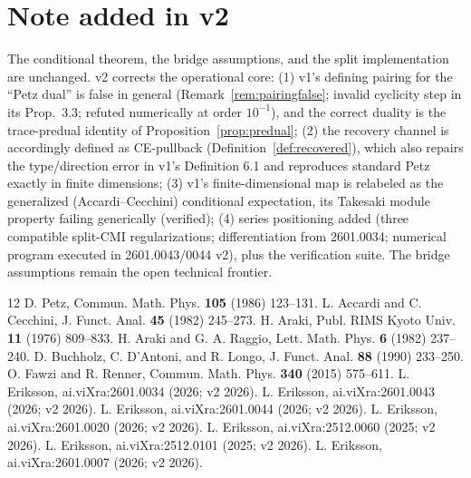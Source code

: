 \documentclass[11pt]{article}
\theoremstyle{remark}
\begin{document}
\section*{Note added in v2}
The conditional theorem, the bridge assumptions, and the split
implementation are unchanged. v2 corrects the operational core:
(1) v1's defining pairing for the ``Petz dual'' is false in general
(Remark~\ref{rem:pairingfalse}; invalid cyclicity step in its Prop.~3.3;
refuted numerically at order $10^{-1}$), and the correct duality is the
trace-predual identity of Proposition~\ref{prop:predual};
(2) the recovery channel is accordingly defined as CE-pullback
(Definition~\ref{def:recovered}), which also repairs the type/direction
error in v1's Definition 6.1 and reproduces standard Petz exactly in
finite dimensions;
(3) v1's finite-dimensional map is relabeled as the generalized
(Accardi--Cecchini) conditional expectation, its Takesaki module property
failing generically (verified);
(4) series positioning added (three compatible split-CMI regularizations;
differentiation from 2601.0034; numerical program executed in
2601.0043/0044 v2), plus the verification suite. The bridge assumptions
remain the open technical frontier.

\begin{thebibliography}{12}
 D. Petz, Commun. Math. Phys. \textbf{105} (1986)
123--131.
 L. Accardi and C. Cecchini, J. Funct. Anal. \textbf{45}
(1982) 245--273.
 H. Araki, Publ. RIMS Kyoto Univ. \textbf{11} (1976)
809--833.
 H. Araki and G. A. Raggio, Lett. Math. Phys. \textbf{6}
(1982) 237--240.
 D. Buchholz, C. D'Antoni, and R. Longo, J. Funct. Anal.
\textbf{88} (1990) 233--250.
 O. Fawzi and R. Renner, Commun. Math. Phys. \textbf{340}
(2015) 575--611.
 L. Eriksson, ai.viXra:2601.0034 (2026; v2 2026).
 L. Eriksson, ai.viXra:2601.0043 (2026; v2 2026).
 L. Eriksson, ai.viXra:2601.0044 (2026; v2 2026).
 L. Eriksson, ai.viXra:2601.0020 (2026; v2 2026).
 L. Eriksson, ai.viXra:2512.0060 (2025; v2 2026).
 L. Eriksson, ai.viXra:2512.0101 (2025; v2 2026).
 L. Eriksson, ai.viXra:2601.0007 (2026; v2 2026).
\end{thebibliography}
\end{document}
